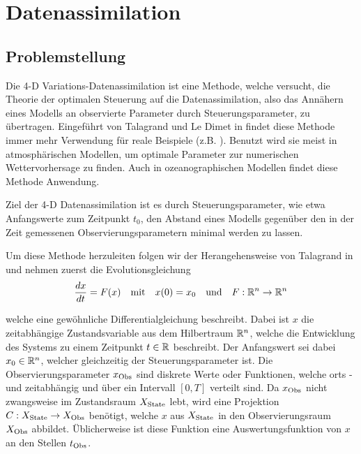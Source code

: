 \chapter{Datenassimilation}
\section{Problemstellung}
Die 4-D Variations-Datenassimilation ist eine Methode, welche versucht, die Theorie der optimalen Steuerung auf die Datenassimilation, also das Annähern eines Modells an observierte Parameter durch Steuerungsparameter, zu übertragen.
Eingeführt von Talagrand und Le Dimet in \cite{dimet1986variational} findet diese Methode immer mehr Verwendung für reale Beispiele (z.B. \cite{korotaev2008retrieving,elbern20004d,broquet2009application}). Benutzt wird sie meist in atmosphärischen Modellen, um optimale Parameter zur numerischen Wettervorhersage zu finden. Auch in ozeanographischen Modellen findet diese Methode Anwendung.

Ziel der 4-D Datenassimilation ist es durch Steuerungsparameter, wie etwa Anfangswerte zum Zeitpunkt $t_0$, den Abstand eines Modells gegenüber den in der Zeit gemessenen Observierungsparametern minimal werden zu lassen. 

Um diese Methode herzuleiten folgen wir der Herangehensweise von Talagrand in \cite{talagrand1987variational} und nehmen zuerst die Evolutionsgleichung
\begin{equation}
\label{eq:odemodel}
 \frac{dx}{dt} = F(x)\quad \text{mit} \quad x(0) = x_0 \quad \text{und}\quad F:\mathbb{R}^n\to \mathbb{R}^n
\end{equation}
  
welche eine gewöhnliche Differentialgleichung beschreibt. Dabei ist $x$ die zeitabhängige Zustandsvariable aus dem Hilbertraum $\mathbb{R}^n$, welche die Entwicklung des Systems zu einem Zeitpunkt $t\in \mathbb{R}$ beschreibt. 
Der Anfangswert sei dabei $x_0 \in \mathbb{R}^n$, welcher gleichzeitig der Steuerungsparameter ist.
Die Observierungsparameter $x_{\text{Obs}}$ sind diskrete Werte oder Funktionen, welche orts - und zeitabhängig und über ein Intervall $[0,T]$ verteilt sind. Da $x_{\text{Obs}}$  nicht zwangsweise im Zustandsraum $X_{\text{State}}$ lebt, wird eine Projektion $C:X_{\text{State}}\to X_{\text{Obs}}$ benötigt, welche $x$ aus $X_{\text{State}}$ in den Observierungsraum $X_{\text{Obs}}$ abbildet. Üblicherweise ist diese Funktion eine Auswertungsfunktion von $x$ an den Stellen $t_{\text{Obs}}$.


